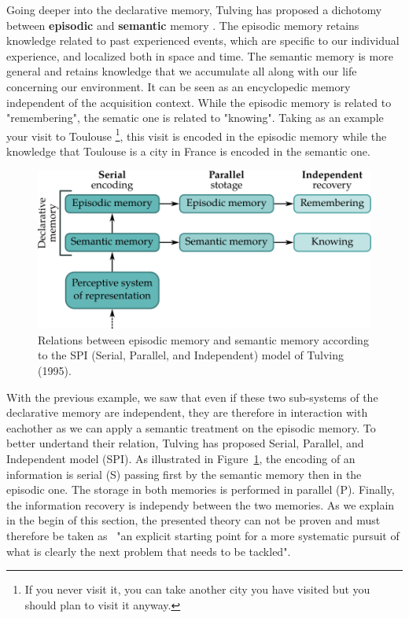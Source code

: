 Going deeper into the declarative memory, Tulving has proposed a dichotomy between \textbf{episodic} and \textbf{semantic} memory \cite{tulving_1995_organization}. The episodic memory retains knowledge related to past experienced events, which are specific to our individual experience, and localized both in space and time. The semantic memory is more general and retains knowledge that we accumulate all along with our life concerning our environment. It can be seen as an encyclopedic memory independent of the acquisition context. While the episodic memory is related to "remembering", the sematic one is related to "knowing". Taking as an example your visit to Toulouse \footnote{If you never visit it, you can take another city you have visited but you should plan to visit it anyway.}, this visit is encoded in the episodic memory while the knowledge that Toulouse is a city in France is encoded in the semantic one.

\begin{figure}[h!]
\centering
\includegraphics[scale=0.45]{figures/introduction/SPI.png}
\caption{\label{fig:SPI} Relations between episodic memory and semantic memory according to the SPI (Serial, Parallel, and Independent) model of Tulving (1995).}
\end{figure}

With the previous example, we saw that even if these two sub-systems of the declarative memory are independent, they are therefore in interaction with eachother as we can apply a semantic treatment on the episodic memory. To better undertand their relation, Tulving has proposed Serial, Parallel, and Independent model (SPI). As illustrated in Figure~\ref{fig:SPI}, the encoding of an information is serial (S) passing first by the semantic memory then in the episodic one. The storage in both memories is performed in parallel (P). Finally, the information recovery is independy between the two memories.
As we explain in the begin of this section, the presented theory can not be proven and must therefore be taken as~\cite{tulving_1995_organization} "an explicit starting point for a more systematic pursuit of what is clearly the next problem that needs to be tackled".

